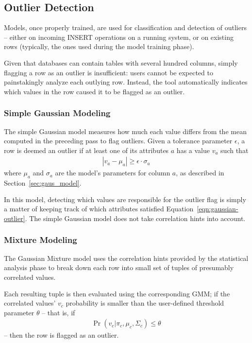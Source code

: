 \subsection{Outlier Detection}
\label{sec:outlier-detection}

Models, once properly trained, are used for classification and detection of outliers -- either on incoming INSERT operations on a running system, or on existing rows (typically, the ones used during the model training phase). %

Given that databases can contain tables with several hundred columns, simply flagging a row as an outlier is insufficient: users cannot be expected to painstakingly analyze each outlying row. Instead, the tool automatically indicates which values in the row caused it to be flagged as an outlier.

\subsubsection{Simple Gaussian Modeling}
The simple Gaussian model measures how much each value differs from the mean computed in the preceding pass to flag outliers. Given a tolerance parameter $\epsilon$, a row is deemed an outlier if at least one of its attributes $a$ has a value $v_a$ such that
\begin{align}
  |v_a - \mu_a| \ge \epsilon \cdot \sigma_a
  \label{eqn:gaussian-outlier}
\end{align}
where $\mu_a$ and $\sigma_a$ are the model's parameters for column $a$, as described in Section~\ref{sec:gaus_model}.

In this model, detecting which values are responsible for the outlier flag is simply a matter of keeping track of which attributes satisfied Equation~\ref{eqn:gaussian-outlier}. The simple Gaussian model does not take correlation hints into account.

\subsubsection{Mixture Modeling}
The Gaussian Mixture model uses the correlation hints provided by the statistical analysis phase to break down each row into small set of tuples of presumably correlated values.

Each resulting tuple is then evaluated using the corresponding GMM; if the correlated values' $v_c$ probability is smaller than the user-defined threshold parameter $\theta$ -- that is, if
\begin{align}
  \Pr(v_c | \pi_c, \mu_c, \Sigma_c) \leq \theta
  \label{eqn:mixture-outlier}
\end{align}
 -- then the row is flagged as an outlier.
 
